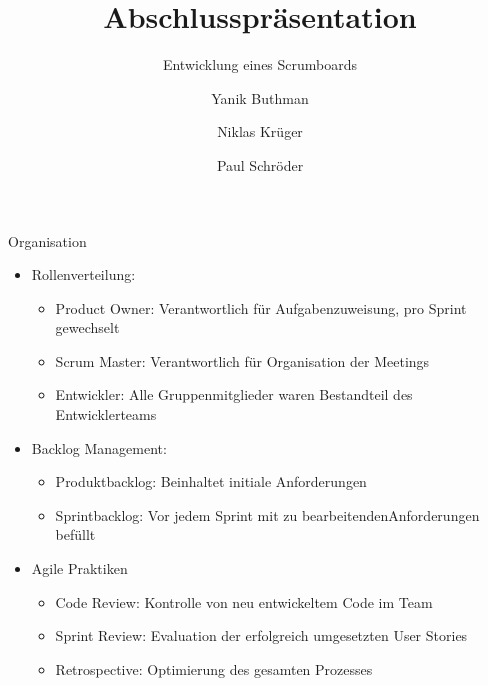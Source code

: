 \documentclass[aspectratio=169,10pt]{beamer}
\title{Abschlusspräsentation}
\subtitle{Entwicklung eines Scrumboards}
\institute{Softwaretechnik Übung 3 Team 3}
\author{Yanik Buthman \and Niklas Krüger \and Paul Schröder}
\begin{document}
	\begin{frame}
		\titlepage
	\end{frame}
	
	\begin{frame}{Organisation}
		\begin{itemize}
			\item Rollenverteilung:
			\begin{itemize}
				\item Product Owner: Verantwortlich für Aufgabenzuweisung, pro Sprint gewechselt
				\item Scrum Master: Verantwortlich für Organisation der Meetings
				\item Entwickler: Alle Gruppenmitglieder waren Bestandteil des Entwicklerteams
			\end{itemize}
			\item Backlog Management:
			\begin{itemize}
				\item Produktbacklog: Beinhaltet initiale Anforderungen
				\item Sprintbacklog: Vor jedem Sprint mit zu bearbeitendenAnforderungen befüllt
			\end{itemize}
			\item Agile Praktiken
			\begin{itemize}
				\item Code Review: Kontrolle von neu entwickeltem Code im Team
				\item Sprint Review: Evaluation der erfolgreich umgesetzten User Stories
				\item Retrospective: Optimierung des gesamten Prozesses
			\end{itemize}
		\end{itemize}
	\end{frame}
	
\end{document}
